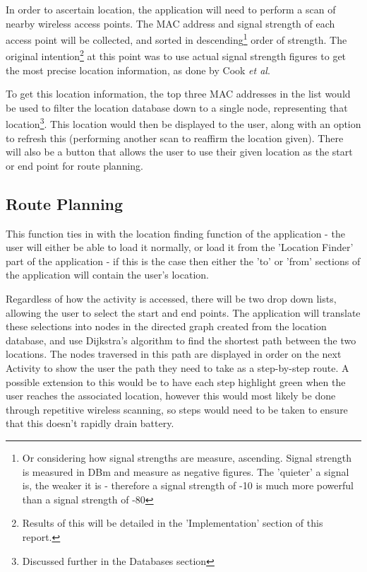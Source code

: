 \documentclass[11pt]{informatics-report}
\begin{document}
In order to ascertain location, the application will need to perform a scan of nearby wireless access points. The MAC address and signal strength of each access point will be collected, and sorted in descending\footnote{Or considering how signal strengths are measure, ascending. Signal strength is measured in DBm and measure as negative figures. The 'quieter' a signal is, the weaker it is - therefore a signal strength of -10 is much more powerful than a signal strength of -80} order of strength.
The original intention\footnote{Results of this will be detailed in the 'Implementation' section of this report.} at this point was to use actual signal strength figures to get the most precise location information, as done by Cook \textit{et al}\cite{cook2005indoor}. 

To get this location information, the top three MAC addresses in the list would be used to filter the location database down to a single node, representing that location\footnote{Discussed further in the Databases section}. This location would then be displayed to the user, along with an option to refresh this (performing another scan to reaffirm the location given). There will also be a button that allows the user to use their given location as the start or end point for route planning.

\subsection{Route Planning}

This function ties in with the location finding function of the application - the user will either be able to load it normally, or load it from the 'Location Finder' part of the application - if this is the case then either the 'to' or 'from' sections of the application will contain the user's location.

Regardless of how the activity is accessed, there will be two drop down lists, allowing the user to select the start and end points. The application will translate these selections into nodes in the directed graph created from the location database, and use Dijkstra's algorithm to find the shortest path between the two locations. The nodes traversed in this path are displayed in order on the next Activity to show the user the path they need to take as a step-by-step route. A possible extension to this would be to have each step highlight green when the user reaches the associated location, however this would most likely be done through repetitive wireless scanning, so steps would need to be taken to ensure that this doesn't rapidly drain battery. 
\end{document}
